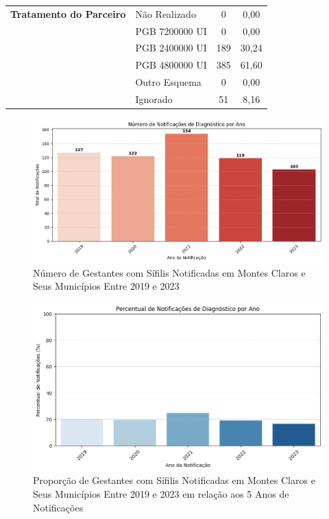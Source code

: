\documentclass[a4paper]{article}
\begin{document}
\begin{multicols}
\begin{table}[htbp]
\begin{tabular}{@{}llcc@{}}
\midrule
\textbf{Tratamento do Parceiro} 
& Não Realizado & 0 & 0,00 \\
& PGB 7200000 UI & 0 & 0,00 \\ 
& PGB 2400000 UI & 189 & 30,24\\ 
& PGB 4800000 UI & 385 & 61,60\\ 
& Outro Esquema & 0 & 0,00\\ 
& Ignorado & 51 & 8,16\\



\bottomrule
\end{tabular}
\end{table}



\begin{figure}[h!]
    \centering
    \includegraphics[width=1\linewidth]{imagens/NotificaçõesAno.png}
    \caption{Número de Gestantes com Sífilis Notificadas em Montes Claros e Seus Municípios Entre 2019 e 2023}
    \label{fig:enter-label}
\end{figure}

\begin{figure}[h!]
    \centering
    \includegraphics[width=1\linewidth]{imagens/Percentual_pelo_todo.png}
    \caption{Proporção de Gestantes com Sífilis Notificadas em Montes Claros e Seus Municípios Entre 2019 e 2023 em relação aos 5 Anos de Notificações}
    \label{fig:enter-label}
\end{figure}


\end{multicols}
\end{document}
